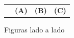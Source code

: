 \documentclass[preprint,12pt,authoryear]{elsarticle}
\begin{document}
\begin{figure}[htpb]
\begin{tabular}{cccc}
        &\textbf{(A)} & \textbf{(B)} & \textbf{(C)}
    \end{tabular}
    \caption{Figuras lado a lado}
    \label{fig:my_label}
\end{figure}

% 

\end{document}
